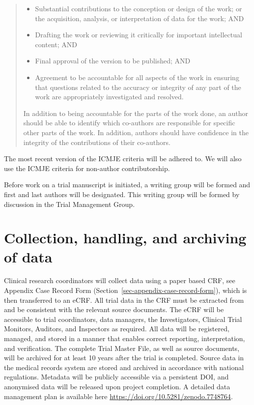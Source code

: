 \documentclass[
]{scrartcl}
\providecommand{\tightlist}{%
  \setlength{\itemsep}{0pt}\setlength{\parskip}{0pt}}\usepackage{longtable,booktabs,array}
\begin{document}
\begin{quote}
\begin{itemize}
\tightlist
\item
  Substantial contributions to the conception or design of the work; or
  the acquisition, analysis, or interpretation of data for the work; AND
\item
  Drafting the work or reviewing it critically for important
  intellectual content; AND
\item
  Final approval of the version to be published; AND
\item
  Agreement to be accountable for all aspects of the work in ensuring
  that questions related to the accuracy or integrity of any part of the
  work are appropriately investigated and resolved.
\end{itemize}

In addition to being accountable for the parts of the work done, an
author should be able to identify which co-authors are responsible for
specific other parts of the work. In addition, authors should have
confidence in the integrity of the contributions of their co-authors.
\end{quote}

The most recent version of the ICMJE criteria will be adhered to. We
will also use the ICMJE criteria for non-author contributorship.

Before work on a trial manuscript is initiated, a writing group will be
formed and first and last authors will be designated. This writing group
will be formed by discussion in the Trial Management Group.

\section{Collection, handling, and archiving of
data}\label{collection-handling-and-archiving-of-data}

Clinical research coordinators will collect data using a paper based
CRF, see Appendix Case Record Form
(Section~\ref{sec-appendix-case-record-form}), which is then transferred
to an eCRF. All trial data in the CRF must be extracted from and be
consistent with the relevant source documents. The eCRF will be
accessible to trial coordinators, data managers, the Investigators,
Clinical Trial Monitors, Auditors, and Inspectors as required. All data
will be registered, managed, and stored in a manner that enables correct
reporting, interpretation, and verification. The complete Trial Master
File, as well as source documents, will be archived for at least 10
years after the trial is completed. Source data in the medical records
system are stored and archived in accordance with national regulations.
Metadata will be publicly accessible via a persistent DOI, and
anonymised data will be released upon project completion. A detailed
data management plan is available here
\url{https://doi.org/10.5281/zenodo.7748764}.
\end{document}
